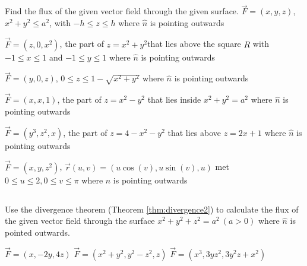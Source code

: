 \begin{Answer}

\end{Answer}

\begin{Exercise} Find the flux of the given vector field through the given surface.
	\Question $\vec F = (x, y, z)$, \quad $x^2+y^2 \leq a^2$, with $-h \leq z \leq h$ where $\hat n$ is pointing outwards %
	
	\Question $\vec F = (z, 0, x^2)$, \quad the part of $z=x^2+y^2$that lies above the square $R$ with $-1 \leq x \leq 1$ and  $-1 \leq y \leq 1$ where $\hat n$ is pointing outwards %
	
	\Question $\vec F = (y, 0, z)$, \quad $0 \leq z \leq 1- \sqrt{x^2+y^2}$ where $\hat n$ is pointing outwards %
	
	\Question $\vec F = (x, x, 1)$, \quad the part of $z=x^2-y^2$ that lies inside $x^2+y^2=a^2$ where $\hat n$ is pointing outwards %
	
	\Question $\vec F = (y^3, z^2, x)$, \quad the part of $z=4-x^2-y^2$ that lies above $z=2x+1$ where $\hat n$ is pointing outwards %
	
	\Question $\vec F = (x, y, z^2)$, \quad $\vec r(u,v) = \left(u \cos(v), u \sin (v), u  \right)$ met $0 \leq u \leq 2, 0 \leq v \leq \pi$ where $\hat n$ is pointing outwards %
\end{Exercise}

\begin{Answer}

\end{Answer}

\subsection*{}
\begin{Exercise} Use the divergence theorem (Theorem \ref{thm:divergence2}) to calculate the flux of the given vector field through the surface $x^2+y^2+z^2=a^2 \ (a > 0)$ where $\hat n$ is pointed outwards.
\begin{multicols}{2}
		\Question $\vec F = \left(x, -2y, 4z \right)$ %
		\Question $\vec F = \left(x^2 + y^2, y^2-z^2, z \right)$ %
		\Question $\vec F = \left(x^3, 3yz^2, 3y^2z+x^2 \right)$ %
	    \EndCurrentQuestion
\end{multicols}
\end{Exercise}

